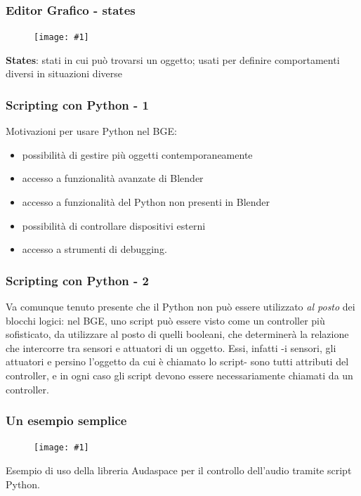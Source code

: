 \documentclass{beamer}
\def\image[#1][#2]{
	\begin{figure}[H]
		\centering
		\texttt{[image: \#1]}
\end{figure}}
\begin{document}
		\begin{frame}
			\frametitle{Editor Grafico - states}
			\image[images/states.png][scale=0.3]
			\textbf{States}: stati in cui può trovarsi un oggetto; usati per definire comportamenti diversi in situazioni diverse %
		\end{frame}
		\begin{frame}
		\frametitle{Scripting con Python - 1}
		Motivazioni per usare Python nel BGE:
			\begin{itemize}
				\item possibilità di gestire più oggetti contemporaneamente
				\item accesso a funzionalità avanzate di Blender
				\item accesso a funzionalità del Python non presenti in Blender
				\item possibilità di controllare dispositivi esterni
				\item accesso a strumenti di debugging.
			\end{itemize}
		\end{frame}	
		\begin{frame}
		\frametitle{Scripting con Python - 2}
		Va comunque tenuto presente che \textcolor{BlenderOrange}{il Python non può essere utilizzato \textit{al posto} dei blocchi logici}: nel BGE, uno script può essere visto come un controller più sofisticato, da utilizzare al posto di quelli booleani, che determinerà la relazione che intercorre tra sensori e attuatori di un oggetto. Essi, infatti -i sensori, 	gli attuatori e persino l'oggetto da cui è chiamato lo script- sono tutti attributi del controller, e in ogni caso gli script devono essere necessariamente chiamati da un controller.
		\end{frame}	
		\begin{frame}
			\frametitle{Un esempio semplice}
			\image[images/pysample.png][scale=0.23]
			Esempio di uso della libreria Audaspace per il controllo dell'audio tramite script Python.
		\end{frame}
	
\end{document}
